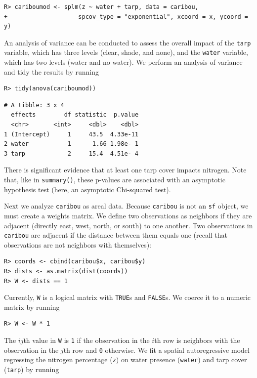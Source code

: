 \documentclass{article}
\begin{document}
\begin{verbatim}
R> cariboumod <- splm(z ~ water + tarp, data = caribou,
+                    spcov_type = "exponential", xcoord = x, ycoord = y)
\end{verbatim}

An analysis of variance can be conducted to assess the overall impact of
the \texttt{tarp} variable, which has three levels (clear, shade, and
none), and the \texttt{water} variable, which has two levels (water and
no water). We perform an analysis of variance and tidy the results by
running

\begin{verbatim}
R> tidy(anova(cariboumod))
\end{verbatim}

\begin{verbatim}
# A tibble: 3 x 4
  effects        df statistic  p.value
  <chr>       <int>     <dbl>    <dbl>
1 (Intercept)     1     43.5  4.33e-11
2 water           1      1.66 1.98e- 1
3 tarp            2     15.4  4.51e- 4
\end{verbatim}

There is significant evidence that at least one tarp cover impacts
nitrogen. Note that, like in \texttt{summary()}, these p-values are
associated with an asymptotic hypothesis test (here, an asymptotic
Chi-squared test).

Next we analyze \texttt{caribou} as areal data. Because \texttt{caribou}
is not an \texttt{sf} object, we must create a weights matrix. We define
two observations as neighbors if they are adjacent (directly east, west,
north, or south) to one another. Two observations in \texttt{caribou}
are adjacent if the distance between them equals one (recall that
observations are not neighbors with themselves):

\begin{verbatim}
R> coords <- cbind(caribou$x, caribou$y)
R> dists <- as.matrix(dist(coords))
R> W <- dists == 1
\end{verbatim}

Currently, \texttt{W} is a logical matrix with \texttt{TRUE}s and
\texttt{FALSE}s. We coerce it to a numeric matrix by running

\begin{verbatim}
R> W <- W * 1
\end{verbatim}

The \(ij\)th value in \texttt{W} is \texttt{1} if the observation in the
\(i\)th row is neighbors with the observation in the \(j\)th row and
\texttt{0} otherwise. We fit a spatial autoregressive model regressing
the nitrogen percentage (\texttt{z}) on water presence (\texttt{water})
and tarp cover (\texttt{tarp}) by running
\end{document}

